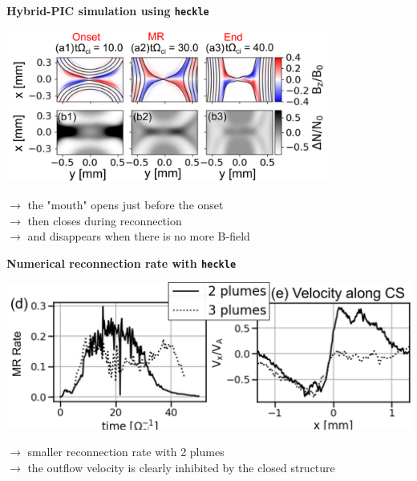 \documentclass[landscape]{slides}
\begin{document}
\begin{slide}
{\large \textbf{Hybrid-PIC simulation using \texttt{heckle}}}

\begin{center}
\includegraphics[width=0.8\textwidth]{heckle.png}
\end{center}

$\to$ the "mouth" opens just before the onset \\
$\to$ then closes during reconnection \\
$\to$ and disappears when there is no more B-field \\

\end{slide}



\begin{slide}
{\large \textbf{Numerical reconnection rate with \texttt{heckle}}}

\begin{center}
\includegraphics[width=1.0\textwidth]{recrate.png}
\end{center}

$\to$ smaller reconnection rate with 2 plumes \\
$\to$ the outflow velocity is clearly inhibited by the closed structure \\

\end{slide}
\end{document}
